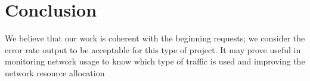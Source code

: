 \documentclass[11pt, USenglish]{article}
\begin{document}
\section{Conclusion}
We believe that our work is coherent with the beginning requests; we consider the error rate output
to be acceptable for this type of project. It may prove useful in monitoring network usage to know which type of traffic is used and improving the network resource allocation

\newpage

\end{document}
